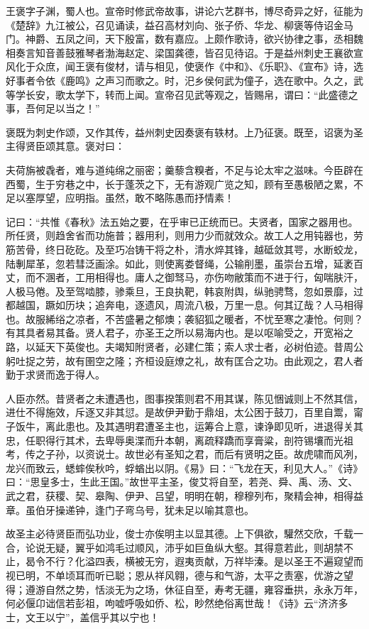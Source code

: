 \documentclass[]{article}
\begin{document}
王褒字子渊，蜀人也。宣帝时修武帝故事，讲论六艺群书，博尽奇异之好，征能为《楚辞》九江被公，召见诵读，益召高材刘向、张子侨、华龙、柳褒等侍诏金马门。神爵、五凤之间，天下殷富，数有嘉应。上颇作歌诗，欲兴协律之事，丞相魏相奏言知音善鼓雅琴者渤海赵定、梁国龚德，皆召见待诏。于是益州刺史王襄欲宣风化于众庶，闻王褒有俊材，请与相见，使褒作《中和》、《乐职》、《宣布》诗，选好事者令依《鹿鸣》之声习而歌之。时，汜乡侯何武为僮子，选在歌中。久之，武等学长安，歌太学下，转而上闻。宣帝召见武等观之，皆赐帛，谓曰：``此盛德之事，吾何足以当之！''

褒既为刺史作颂，又作其传，益州刺史因奏褒有轶材。上乃征褒。既至，诏褒为圣主得贤臣颂其意。褒对曰：

夫荷旃被毳者，难与道纯绵之丽密；羹藜含糗者，不足与论太牢之滋味。今臣辟在西蜀，生于穷巷之中，长于蓬茨之下，无有游观广览之知，顾有至愚极陋之累，不足以塞厚望，应明指。虽然，敢不略陈愚而抒情素！

记曰：``共惟《春秋》法五始之要，在乎审已正统而已。夫贤者，国家之器用也。所任贤，则趋舍省而功施普；器用利，则用力少而就效众。故工人之用钝器也，劳筋苦骨，终日矻矻。及至巧冶铸干将之朴，清水焠其锋，越砥敛其咢，水断蛟龙，陆剸犀革，忽若彗泛画涂。如此，则使离娄督绳，公输削墨，虽崇台五增，延袤百丈，而不溷者，工用相得也。庸人之御驽马，亦伤吻敝策而不进于行，匈喘肤汗，人极马倦。及至驾啮膝，骖乘旦，王良执靶，韩哀附舆，纵驰骋骛，忽如景靡，过都越国，蹶如历块；追奔电，逐遗风，周流八极，万里一息。何其辽哉？人马相得也。故服絺绤之凉者，不苦盛暑之郁燠；袭貂狐之暖者，不忧至寒之凄怆。何则？有其具者易其备。贤人君子，亦圣王之所以易海内也。是以呕喻受之，开宽裕之路，以延天下英俊也。夫竭知附贤者，必建仁策；索人求士者，必树伯迹。昔周公躬吐捉之劳，故有圉空之隆；齐桓设庭燎之礼，故有匡合之功。由此观之，君人者勤于求贤而逸于得人。

人臣亦然。昔贤者之未遭遇也，图事揆策则君不用其谋，陈见悃诚则上不然其信，进仕不得施效，斥逐又非其愆。是故伊尹勤于鼎俎，太公困于鼓刀，百里自鬻，甯子饭牛，离此患也。及其遇明君遭圣主也，运筹合上意，谏诤即见听，进退得关其忠，任职得行其术，去卑辱奥渫而升本朝，离疏释蹻而享膏粱，剖符锡壤而光祖考，传之子孙，以资说士。故世必有圣知之君，而后有贤明之臣。故虎啸而风冽，龙兴而致云，蟋蟀俟秋吟，蜉蝤出以阴。《易》曰：``飞龙在天，利见大人。''《诗》曰：``思皇多士，生此王国。''故世平主圣，俊艾将自至，若尧、舜、禹、汤、文、武之君，获稷、契、皋陶、伊尹、吕望，明明在朝，穆穆列布，聚精会神，相得益章。虽伯牙操递钟，逢门子弯乌号，犹未足以喻其意也。

故圣主必待贤臣而弘功业，俊士亦俟明主以显其德。上下俱欲，驩然交欣，千载一合，论说无疑，翼乎如鸿毛过顺风，沛乎如巨鱼纵大壑。其得意若此，则胡禁不止，曷令不行？化溢四表，横被无穷，遐夷贡献，万祥毕溱。是以圣王不遍窥望而视已明，不单顷耳而听已聪；恩从祥风翱，德与和气游，太平之责塞，优游之望得；遵游自然之势，恬淡无为之场，休征自至，寿考无疆，雍容垂拱，永永万年，何必偃卬诎信若彭祖，呴嘘呼吸如侨、松，眇然绝俗离世哉！《诗》云``济济多士，文王以宁''，盖信乎其以宁也！
\end{document}
